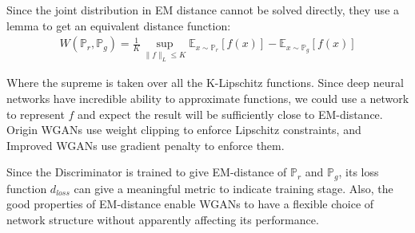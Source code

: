 Since the joint distribution in EM distance cannot be solved directly, they use a lemma to get an equivalent distance function:
\begin{equation}
\begin{aligned}
W(\mathbb{P}_r,\mathbb{P}_g) = \frac{1}{K} \sup \limits_{\|f\|_L\le K} \mathbb{E}_{x\sim\mathbb{P}_r}[f(x)]-\mathbb{E}_{x\sim\mathbb{P}_g}[f(x)]
\end{aligned}
\end{equation}

Where the supreme is taken over all the K-Lipschitz functions. Since deep neural networks have incredible ability to approximate functions, we could use a network to represent $f$ and expect the result will be sufficiently close to EM-distance. Origin WGANs use weight clipping to enforce Lipschitz constraints, and Improved WGANs\cite{gulrajani2017improved} use gradient penalty to enforce them.

Since the Discriminator is trained to give EM-distance of $\mathbb{P}_r$ and $\mathbb{P}_g$, its loss function $d_{loss}$ can give a meaningful metric to indicate training stage. Also, the good properties of EM-distance enable WGANs to have a flexible choice of network structure without apparently affecting its performance.
